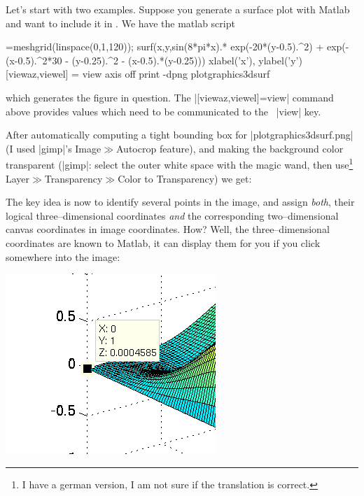 {Let's start with two examples. Suppose you generate a surface plot with Matlab and want to include it in \PGFPlots. We have the matlab script
\begin{codeexample}=meshgrid(linspace(0,1,120));
surf(x,y,sin(8*pi*x).* exp(-20*(y-0.5).^2) + exp(-(x-0.5).^2*30 - (y-0.25).^2 - (x-0.5).*(y-0.25)))
xlabel('x'), ylabel('y')
[viewaz,viewel] = view
axis off
print -dpng plotgraphics3dsurf
\end{codeexample}
which generates the figure in question. The |[viewaz,viewel]=view| command above provides values which need to be communicated to the \PGFPlots\ |view| key.

After automatically computing a tight bounding box for |plotgraphics3dsurf.png| (I used |gimp|'s Image$\gg$Autocrop feature), and making the background color transparent (|gimp|: select the outer white space with the magic wand, then use\footnote{I have a german version, I am not sure if the translation is correct.} Layer$\gg$Transparency$\gg$Color to Transparency) we get:

{\setlength{\fboxsep}{0pt}%
%
}%

The key idea is now to identify several points in the image, and assign \emph{both}, their logical three--dimensional coordinates \emph{and} the corresponding two--dimensional canvas coordinates in image coordinates. How? Well, the three--dimensional coordinates are known to Matlab, it can display them for you if you click somewhere into the image:

\includegraphics{plotdata/plotgraphics3dsurfmatlab.png}%

}
